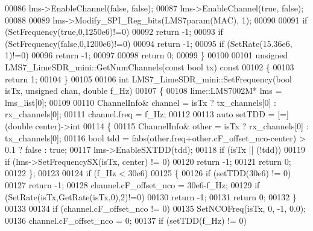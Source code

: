 \begin{DoxyCode}
00086     lms->EnableChannel(\textcolor{keyword}{false}, \textcolor{keyword}{false});
00087     lms->EnableChannel(\textcolor{keyword}{true}, \textcolor{keyword}{false});
00088 
00089     lms->Modify_SPI_Reg_bits(LMS7param(MAC), 1);
00090 
00091     \textcolor{keywordflow}{if} (SetFrequency(\textcolor{keyword}{true},0,1250e6)!=0)
00092         \textcolor{keywordflow}{return} -1;
00093     \textcolor{keywordflow}{if} (SetFrequency(\textcolor{keyword}{false},0,1200e6)!=0)
00094         \textcolor{keywordflow}{return} -1;
00095     \textcolor{keywordflow}{if} (SetRate(15.36e6, 1)!=0)
00096         \textcolor{keywordflow}{return} -1;
00097 
00098     \textcolor{keywordflow}{return} 0;
00099 \}
00100 
00101 \textcolor{keywordtype}{unsigned} LMS7_LimeSDR_mini::GetNumChannels(\textcolor{keyword}{const} \textcolor{keywordtype}{bool} tx)\textcolor{keyword}{ const}
00102 \textcolor{keyword}{}\{
00103     \textcolor{keywordflow}{return} 1;
00104 \}
00105 
00106 \textcolor{keywordtype}{int} LMS7_LimeSDR_mini::SetFrequency(\textcolor{keywordtype}{bool} isTx, \textcolor{keywordtype}{unsigned} chan, \textcolor{keywordtype}{double} f\_Hz)
00107 \{
00108     lime::LMS7002M* lms = lms_list[0];
00109 
00110     ChannelInfo& channel = isTx ? tx_channels[0] : rx_channels[0];
00111     channel.freq = f\_Hz;
00112 
00113     \textcolor{keyword}{auto} setTDD = [=](\textcolor{keywordtype}{double} center)->\textcolor{keywordtype}{int}
00114     \{
00115         ChannelInfo& other = isTx ? rx_channels[0] : tx_channels[0];
00116         \textcolor{keywordtype}{bool} tdd =  fabs(other.freq+other.cF_offset_nco-center) > 0.1 ? \textcolor{keyword}{false} : \textcolor{keyword}{true};
00117         lms->EnableSXTDD(tdd);
00118         \textcolor{keywordflow}{if} (isTx || (!tdd))
00119             \textcolor{keywordflow}{if} (lms->SetFrequencySX(isTx, center) != 0)
00120                 \textcolor{keywordflow}{return} -1;
00121         \textcolor{keywordflow}{return} 0;
00122     \};
00123 
00124     \textcolor{keywordflow}{if} (f\_Hz < 30e6)
00125     \{
00126         \textcolor{keywordflow}{if} (setTDD(30e6) != 0)
00127             \textcolor{keywordflow}{return} -1;
00128         channel.cF_offset_nco = 30e6-f\_Hz;
00129         \textcolor{keywordflow}{if} (SetRate(isTx,GetRate(isTx,0),2)!=0)
00130             \textcolor{keywordflow}{return} -1;
00131         \textcolor{keywordflow}{return} 0;
00132     \}
00133 
00134     \textcolor{keywordflow}{if} (channel.cF_offset_nco != 0)
00135         SetNCOFreq(isTx, 0, -1, 0.0);
00136     channel.cF_offset_nco = 0;
00137     \textcolor{keywordflow}{if} (setTDD(f\_Hz) != 0)

\end{DoxyCode}
